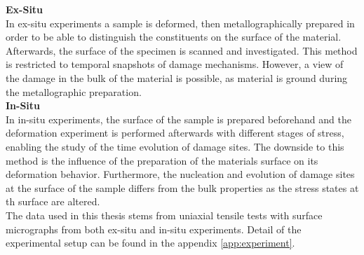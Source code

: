 \noindent \textbf{Ex-Situ}\\
In ex-situ experiments a sample is deformed, then metallographically prepared in order to be able to distinguish the constituents on the surface of the material. Afterwards, the surface of the specimen is scanned and investigated. This method is restricted to temporal snapshots of damage mechanisms. However, a view of the damage in the bulk of the material is possible, as material is ground during the metallographic preparation.\\

\noindent \textbf{In-Situ}\\
In in-situ experiments, the surface of the sample is prepared beforehand and the deformation experiment is performed afterwards with different stages of stress, enabling the study of the time evolution of damage sites. The downside to this method is the influence of the preparation of the materials surface on its deformation behavior. Furthermore, the nucleation and evolution of damage sites at the surface of the sample differs from the bulk properties as the stress states at th surface are altered. \\

The data used in this thesis stems from uniaxial tensile tests with surface micrographs from both ex-situ and in-situ experiments. Detail of the experimental setup can be found in the appendix \ref{app:experiment}.



